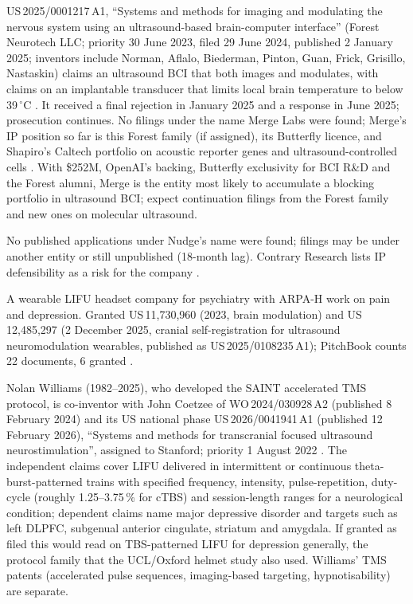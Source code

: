\documentclass[11pt,a4paper]{article}
\begin{document}
\begin{description}[leftmargin=*]
\item[Forest Neurotech / Arbor / Merge Labs.] US\,2025/0001217\,A1, ``Systems and methods for imaging and modulating the nervous system using an ultrasound-based brain-computer interface'' (Forest Neurotech LLC; priority 30 June 2023, filed 29 June 2024, published 2 January 2025; inventors include Norman, Aflalo, Biederman, Pinton, Guan, Frick, Grisillo, Nastaskin) claims an ultrasound BCI that both images and modulates, with claims on an implantable transducer that limits local brain temperature to below 39\,$^\circ$C \cite{forest_patent}. It received a final rejection in January 2025 and a response in June 2025; prosecution continues. No filings under the name Merge Labs were found; Merge's IP position so far is this Forest family (if assigned), its Butterfly licence, and Shapiro's Caltech portfolio on acoustic reporter genes and ultrasound-controlled cells \cite{merge,bfly_merge}. With \$252M, OpenAI's backing, Butterfly exclusivity for BCI R\&D and the Forest alumni, Merge is the entity most likely to accumulate a blocking portfolio in ultrasound BCI; expect continuation filings from the Forest family and new ones on molecular ultrasound.
\item[Nudge.] No published applications under Nudge's name were found; filings may be under another entity or still unpublished (18-month lag). Contrary Research lists IP defensibility as a risk for the company \cite{nudge}.
\item[Attune Neurosciences.] A wearable LIFU headset company for psychiatry with ARPA-H work on pain and depression. Granted US\,11,730,960 (2023, brain modulation) and US\,12,485,297 (2 December 2025, cranial self-registration for ultrasound neuromodulation wearables, published as US\,2025/0108235\,A1); PitchBook counts 22 documents, 6 granted \cite{attune}.
\item[Stanford / Nolan Williams.] Nolan Williams (1982--2025), who developed the SAINT accelerated TMS protocol, is co-inventor with John Coetzee of WO\,2024/030928\,A2 (published 8 February 2024) and its US national phase US\,2026/0041941\,A1 (published 12 February 2026), ``Systems and methods for transcranial focused ultrasound neurostimulation'', assigned to Stanford; priority 1 August 2022 \cite{williams_patent}. The independent claims cover LIFU delivered in intermittent or continuous theta-burst-patterned trains with specified frequency, intensity, pulse-repetition, duty-cycle (roughly 1.25--3.75\,\% for cTBS) and session-length ranges for a neurological condition; dependent claims name major depressive disorder and targets such as left DLPFC, subgenual anterior cingulate, striatum and amygdala. If granted as filed this would read on TBS-patterned LIFU for depression generally, the protocol family that the UCL/Oxford helmet study also used. Williams' TMS patents (accelerated pulse sequences, imaging-based targeting, hypnotisability) are separate.

\end{description}
\end{document}
